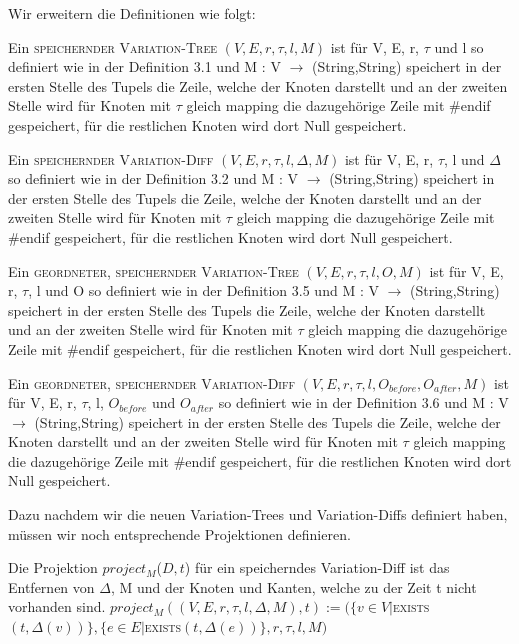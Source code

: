 Wir erweitern die Definitionen wie folgt:
\begin{definition}
	Ein \textsc{speichernder Variation-Tree} $(V,E,r,\tau,l,M) $ ist für V, E, r, $\tau$ und l so definiert wie in der Definition 3.1 und M : V $\rightarrow$ (String,String) speichert in der ersten Stelle des Tupels die Zeile, welche der Knoten darstellt und an der zweiten Stelle wird für Knoten mit $\tau$ gleich mapping die dazugehörige Zeile mit \#endif gespeichert, für die restlichen Knoten wird dort Null gespeichert.
\end{definition}
\begin{definition}
	Ein \textsc{speichernder Variation-Diff} $(V,E,r,\tau,l,\Delta,M) $ ist für V, E, r, $\tau$, l und $\Delta$ so definiert wie in der Definition 3.2 und M : V $\rightarrow$ (String,String) speichert in der ersten Stelle des Tupels die Zeile, welche der Knoten darstellt und an der zweiten Stelle wird für Knoten mit $\tau$ gleich mapping die dazugehörige Zeile mit \#endif gespeichert, für die restlichen Knoten wird dort Null gespeichert.
\end{definition}
\begin{definition}
	Ein \textsc{geordneter, speichernder Variation-Tree} $(V,E,r,\tau,l,O,M) $ ist für V, E, r, $\tau$, l und O so definiert wie in der Definition 3.5 und M : V $\rightarrow$ (String,String) speichert in der ersten Stelle des Tupels die Zeile, welche der Knoten darstellt und an der zweiten Stelle wird für Knoten mit $\tau$ gleich mapping die dazugehörige Zeile mit \#endif gespeichert, für die restlichen Knoten wird dort Null gespeichert.
\end{definition}
\begin{definition}
	Ein \textsc{geordneter, speichernder Variation-Diff} $(V,E,r,\tau,l,O_{before},O_{after},M) $ ist für V, E, r, $\tau$, l, $O_{before}$ und $O_{after}$ so definiert wie in der Definition 3.6 und M : V $\rightarrow$ (String,String) speichert in der ersten Stelle des Tupels die Zeile, welche der Knoten darstellt und an der zweiten Stelle wird für Knoten mit $\tau$ gleich mapping die dazugehörige Zeile mit \#endif gespeichert, für die restlichen Knoten wird dort Null gespeichert.
\end{definition}
Dazu nachdem wir die neuen Variation-Trees und Variation-Diffs definiert haben, müssen wir noch entsprechende Projektionen definieren.
\begin{definition}
	Die Projektion $project_{M}$($D,t$) für ein speicherndes Variation-Diff ist das Entfernen von $\Delta$, M und der Knoten und Kanten, welche zu der Zeit t nicht vorhanden sind. $project_{M}$$((V,E,r,\tau,l,\Delta,M),t) := (\{v \in V | $\textsc{exists}$(t,\Delta(v))\},\{e \in E | $\textsc{exists}$(t,\Delta(e))\},r,\tau,l,M)$
\end{definition}
